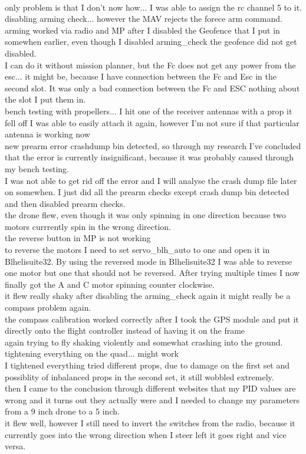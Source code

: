 \documentclass{article}
\begin{document}
	\\ only problem is that I don't now how... I was able to assign the rc channel 5 to it. 
	\\ disabling arming check... however the MAV rejects the forece arm command. 
	\\ arming worked via radio and MP after I disabled the Geofence that I put in somewhen earlier, even though I disabled arming\_check the geofence did not get disabled.
	\\ I can do it without mission planner, but the Fc does not get any power from the esc... it might be, because I have connection between the Fc and Esc in the second slot. It was only a bad connection between the Fc and ESC nothing about the slot I put them in. 
	\\ bench testing with propellers... I hit one of the receiver antennas with a prop it fell off I was able to easily attach it again, however I'm not sure if that particular antenna is working now
	\\ new prearm error crashdump bin detected, so through my research I've concluded that the error is currently insignificant, because it was probably caused through my bench testing.
	\\ I was not able to get rid off the error and I will analyse the crash dump file later on somewhen. I just did all the prearm checks except crash dump bin detected and then disabled prearm checks. 
	\\ the drone flew, even though it was only spinning in one direction because two motors currrently spin in the wrong direction.
	\\ the reverse button in MP is not working
	\\ to reverse the motors I need to set servo\_blh\_auto to one and open it in Blhelisuite32\cite{BLHeliSuite32}. By using the reversed mode in Blhelisuite32 I was able to reverse one motor but one that should not be reversed. After trying multiple times I now finally got the A and C motor spinning counter clockwise. 
	\\ it flew really shaky after disabling the arming\_check again it might really be a compass problem again.
	\\ the compass calibration worked correctly after I took the GPS module and put it directly onto the flight controller instead of having it on the frame
	\\ again trying to fly shaking violently and somewhat crashing into the ground.
	\\ tightening everything on the quad... might work
	\\ I tightened everything tried different props, due to damage on the first set and possiblity of inbalanced props in the second set, it still wobbled extremely. 
	\\ then I came to the conclusion through different websites that my PID values are wrong and it turns out they actually were and I needed to change my parameters from a 9 inch drone to a 5 inch.
	\\ it flew well, however I still need to invert the switches from the radio, because it currently goes into the wrong direction when I steer left it goes right and vice versa. 
	
\end{document}
